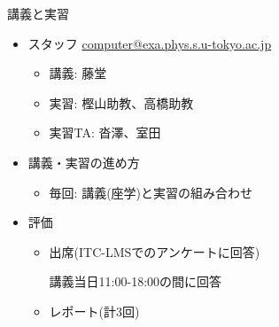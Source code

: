 \begin{frame}[t,fragile]{講義と実習}
  \begin{itemize}
  \item スタッフ \href{mailto:computer@exa.phys.s.u-tokyo.ac.jp}{computer@exa.phys.s.u-tokyo.ac.jp}
    \begin{itemize}
    \item 講義: 藤堂
    \item 実習: 樫山助教、高橋助教
    \item 実習TA: 沓澤、室田
    \end{itemize}
  \item 講義・実習の進め方
    \begin{itemize}
    \item 毎回: 講義(座学)と実習の組み合わせ
    \end{itemize}
  \item 評価
    \begin{itemize}
    \item 出席(ITC-LMSでのアンケートに回答)

      講義当日11:00-18:00の間に回答
      
    \item レポート(計3回)
    \end{itemize}    
  \end{itemize}    
\end{frame}

